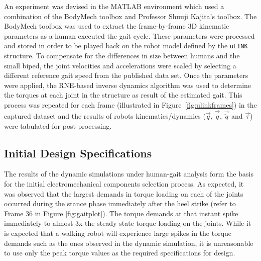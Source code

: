 An experiment was devised in the MATLAB environment which used a combination of the BodyMech toolbox and Professor Shuuji Kajita's toolbox. The BodyMech toolbox was used to extract the frame-by-frame 3D kinematic parameters as a human executed the gait cycle. These parameters were processed and stored in order to be played back on the robot model defined by the \texttt{uLINK} structure. To compensate for the differences in size between humans and the small biped, the joint velocities and accelerations were scaled by selecting a different reference gait speed from the published data set. Once the parameters were applied, the RNE-based inverse dynamics algorithm was used to determine the torques at each joint in the structure as result of the estimated gait. This process was repeated for each frame (illustrated in Figure~\ref{fig:ulinkframes}) in the captured dataset and the results of robots kinematics/dynamics ($\vec{q}$, $\vec{\dot{q}}$, $\vec{\ddot{q}}$ and $\vec{\tau}$) were tabulated for post processing. 


\subsection{Initial Design Specifications} %
\label{sec:initial_design_requirements}
The results of the dynamic simulations under human-gait analysis form the basis for the initial electromechanical components selection process. As expected, it was observed that the largest demands in torque loading on each of the joints occurred during the stance phase immediately after the heel strike (refer to Frame 36 in Figure \ref{fig:gaitplot}). The torque demands at that instant spike immediately to almost 3x the steady state torque loading on the joints. While it is expected that a walking robot will experience large spikes in the torque demands such as the ones observed in the dynamic simulation, it is unreasonable to use only the peak torque values as the required specifications for design. 


